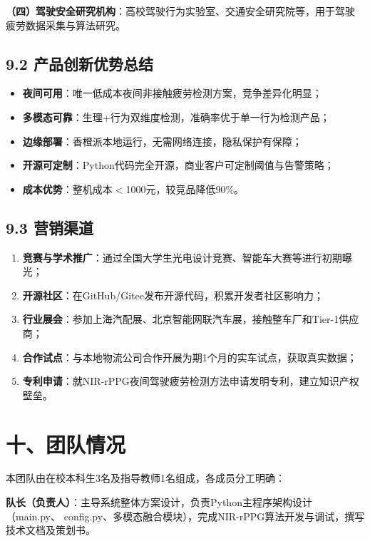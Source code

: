 \documentclass[a4paper,12pt]{article}
\begin{document}
\textbf{（四）驾驶安全研究机构}：高校驾驶行为实验室、交通安全研究院等，用于驾驶
疲劳数据采集与算法研究。

\subsection*{9.2 产品创新优势总结}

\begin{itemize}[leftmargin=2em, itemsep=3pt]
  \item \textbf{夜间可用}：唯一低成本夜间非接触疲劳检测方案，竞争差异化明显；
  \item \textbf{多模态可靠}：生理+行为双维度检测，准确率优于单一行为检测产品；
  \item \textbf{边缘部署}：香橙派本地运行，无需网络连接，隐私保护有保障；
  \item \textbf{开源可定制}：Python代码完全开源，商业客户可定制阈值与告警策略；
  \item \textbf{成本优势}：整机成本$<$1000元，较竞品降低90\%。
\end{itemize}

\subsection*{9.3 营销渠道}

\begin{enumerate}[leftmargin=2em, itemsep=2pt]
  \item \textbf{竞赛与学术推广}：通过全国大学生光电设计竞赛、智能车大赛等进行初期曝光；
  \item \textbf{开源社区}：在GitHub/Gitee发布开源代码，积累开发者社区影响力；
  \item \textbf{行业展会}：参加上海汽配展、北京智能网联汽车展，接触整车厂和Tier-1供应商；
  \item \textbf{合作试点}：与本地物流公司合作开展为期1个月的实车试点，获取真实数据；
  \item \textbf{专利申请}：就NIR-rPPG夜间驾驶疲劳检测方法申请发明专利，建立知识产权壁垒。
\end{enumerate}

\section*{十、团队情况}

本团队由在校本科生3名及指导教师1名组成，各成员分工明确：

\textbf{队长（负责人）}：主导系统整体方案设计，负责Python主程序架构设计（main.py、
config.py、多模态融合模块），完成NIR-rPPG算法开发与调试，撰写技术文档及策划书。
\end{document}
